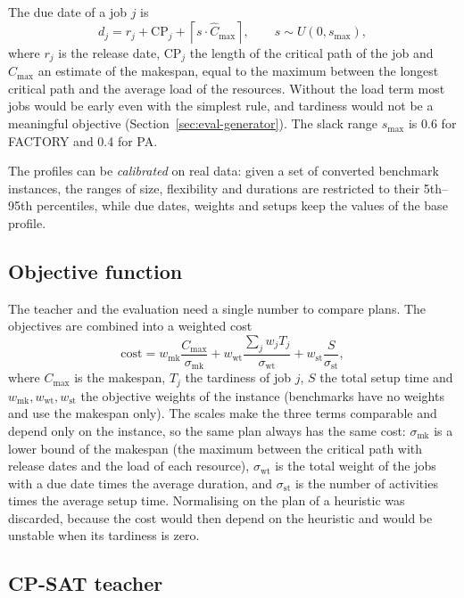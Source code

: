 The due date of a job $j$ is
\[
  d_j = r_j + \mathrm{CP}_j + \left\lceil s \cdot \hat C_{\max} \right\rceil,
  \qquad s \sim U(0, s_{\max}),
\]
where $r_j$ is the release date, $\mathrm{CP}_j$ the length of the critical path of the job and
$\hat C_{\max}$ an estimate of the makespan, equal to the maximum between the longest critical
path and the average load of the resources. Without the load term most jobs would be early even
with the simplest rule, and tardiness would not be a meaningful objective
(Section~\ref{sec:eval-generator}). The slack range $s_{\max}$ is 0.6 for FACTORY and 0.4 for PA.

The profiles can be \emph{calibrated} on real data: given a set of converted benchmark instances,
the ranges of size, flexibility and durations are restricted to their 5th--95th percentiles, while
due dates, weights and setups keep the values of the base profile.

\subsection{Objective function}
\label{sec:objective}

The teacher and the evaluation need a single number to compare plans. The objectives are
combined into a weighted cost
\[
  \mathrm{cost} = w_{\mathrm{mk}} \frac{C_{\max}}{\sigma_{\mathrm{mk}}}
               + w_{\mathrm{wt}} \frac{\sum_j w_j T_j}{\sigma_{\mathrm{wt}}}
               + w_{\mathrm{st}} \frac{S}{\sigma_{\mathrm{st}}},
\]
where $C_{\max}$ is the makespan, $T_j$ the tardiness of job $j$, $S$ the total setup time and
$w_{\mathrm{mk}}, w_{\mathrm{wt}}, w_{\mathrm{st}}$ the objective weights of the instance
(benchmarks have no weights and use the makespan only). The scales make the three terms
comparable and depend only on the instance, so the same plan always has the same cost:
$\sigma_{\mathrm{mk}}$ is a lower bound of the makespan (the maximum between the critical path
with release dates and the load of each resource), $\sigma_{\mathrm{wt}}$ is the total weight of
the jobs with a due date times the average duration, and $\sigma_{\mathrm{st}}$ is the number of
activities times the average setup time. Normalising on the plan of a heuristic was discarded,
because the cost would then depend on the heuristic and would be unstable when its tardiness is
zero.

\subsection{CP-SAT teacher}
\label{sec:teacher}

